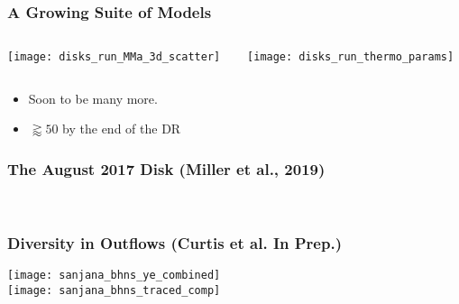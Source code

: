 \documentclass[]{beamer}
\begin{document}
\begin{frame}
  \frametitle{A Growing Suite of Models}
  \begin{columns}
    \begin{column}{4cm}
      \begin{center}
        \texttt{[image: disks\_run\_MMa\_3d\_scatter]}
      \end{center}
    \end{column}
    \begin{column}{8cm}
      \begin{center}
        \texttt{[image: disks\_run\_thermo\_params]}
      \end{center}
    \end{column}
  \end{columns}
  \begin{itemize}
  \item Soon to be many more.
  \item $\gtrapprox 50$ by the end of the DR
  \end{itemize}
\end{frame}

\begin{frame}
  \frametitle{The August 2017 Disk (Miller et al., 2019)}
  \begin{center}
     \\
  \end{center}
\end{frame}

\begin{frame}
  \frametitle{Diversity in Outflows (Curtis et al. In Prep.)}
  \begin{center}
    \texttt{[image: sanjana\_bhns\_ye\_combined]}\\
    \texttt{[image: sanjana\_bhns\_traced\_comp]}
  \end{center}
\end{frame}
\end{document}
